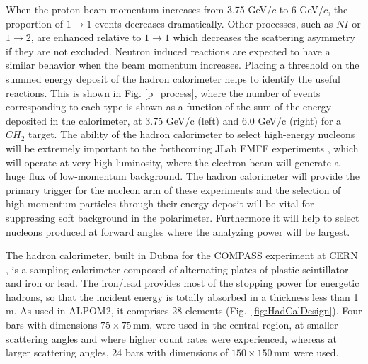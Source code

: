 \documentclass[epj]{svjour}
\begin{document}
When the proton beam momentum increases from 3.75 GeV$/c$ to 6 GeV$/c$, the proportion of  $1 \to 1$ events decreases dramatically. Other processes, such as $NI$ or $1 \to 2$, are enhanced relative to $1 \to 1$ which decreases the scattering asymmetry if they are not excluded. Neutron induced reactions are expected to have a similar behavior when the beam momentum increases. Placing a threshold on the summed energy deposit of the hadron calorimeter helps to identify the useful reactions. This is shown in Fig. \ref{p_process}, where the number of events corresponding to each type is shown as a function of the sum of the energy deposited in the calorimeter, at 3.75 GeV/c (left) and 6.0 GeV/c (right) for a $CH_2$ target.
%
%
The ability of the hadron calorimeter to select high-energy nucleons will be extremely important to the forthcoming  JLab EMFF experiments \cite{PR12-17-004,PR12-07-109}, which will operate at very high luminosity, where the electron beam will generate a huge flux of low-momentum background. The hadron calorimeter will provide the primary trigger for the nucleon arm of these experiments and the selection of high momentum particles through their energy deposit will be vital for suppressing soft background in the polarimeter. Furthermore it will help to select nucleons produced at forward angles where the analyzing power will be largest.




The hadron calorimeter, built in Dubna for the COMPASS experiment at CERN  \cite{Vlasov:2006,abbon:2007},  is a sampling calorimeter composed of alternating plates of plastic scintillator and iron or lead. The iron/lead provides most of the stopping power for energetic hadrons, so that the incident energy is totally absorbed in a thickness  less than 1 m. As used in ALPOM2, it comprises  28 elements (Fig.~\ref{fig:HadCalDesign}). Four bars with dimensions $75\times75$\,mm, were used in the central region, at smaller scattering angles and where higher count rates were experienced,  whereas at larger scattering angles, 24 bars with dimensions of $150\times150$\,mm were used.
\end{document}
